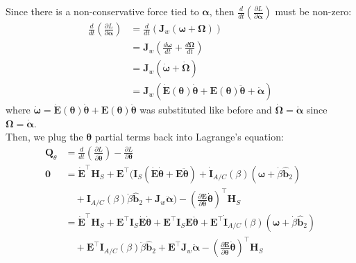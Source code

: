\documentclass[titlepage]{article}
\begin{document}
Since there is a non-conservative force tied to $\boldsymbol{\alpha}$, then $\frac{d}{dt}(\frac{\partial L}{\partial\dot{\boldsymbol{\alpha}}})$ must be non-zero:
\begin{equation}
	\begin{split}
		\frac{d}{dt}\left(\frac{\partial L}{\partial\dot{\boldsymbol{\alpha}}}\right)&=\frac{d}{dt}\left(\boldsymbol{J}_w\left(\boldsymbol{\omega}+\boldsymbol{\Omega}\right)\right) \\
		&=\boldsymbol{J}_w\left(\frac{d\boldsymbol{\omega}}{dt}+\frac{d\boldsymbol{\Omega}}{dt}\right) \\
		&=\boldsymbol{J}_w\left(\dot{\boldsymbol{\omega}}+\dot{\boldsymbol{\Omega}}\right) \\
		&=\boldsymbol{J}_w\left(\dot{\boldsymbol{E}}(\boldsymbol{\theta})\dot{\boldsymbol{\theta}}+\boldsymbol{E}(\boldsymbol{\theta})\ddot{\boldsymbol{\theta}}+\ddot{\boldsymbol{\alpha}}\right)
	\end{split}
\end{equation}
where $\dot{\boldsymbol{\omega}}=\dot{\boldsymbol{E}}(\boldsymbol{\theta})\dot{\boldsymbol{\theta}}+\boldsymbol{E}(\boldsymbol{\theta})\ddot{\boldsymbol{\theta}}$ was substituted like before and $\dot{\boldsymbol{\Omega}}=\ddot{\boldsymbol{\alpha}}$ since $\boldsymbol{\Omega}=\dot{\boldsymbol{\alpha}}$. \\

Then, we plug the $\boldsymbol{\theta}$ partial terms back into Lagrange's equation:
\begin{equation}
	\begin{split}
		\boldsymbol{Q}_\theta&=\frac{d}{dt}\left(\frac{\partial L}{\partial\dot{\boldsymbol{\theta}}}\right)-\frac{\partial L}{\partial\boldsymbol{\theta}} \\
		\boldsymbol{0}&=\dot{\boldsymbol{E}}^\top\boldsymbol{H}_S+\boldsymbol{E}^\top\Big(\boldsymbol{I}_S\left(\dot{\boldsymbol{E}}\dot{\boldsymbol{\theta}}+\boldsymbol{E}\ddot{\boldsymbol{\theta}}\right)+\dot{\boldsymbol{I}}_{A/C}(\beta)\left(\boldsymbol{\omega}+\dot{\beta}\hat{\boldsymbol{b}}_2\right) \\
		&\quad+\boldsymbol{I}_{A/C}(\beta)\ddot{\beta}\hat{\boldsymbol{b}}_2+\boldsymbol{J}_w\ddot{\boldsymbol{\alpha}}\Big)-\left(\frac{\partial\boldsymbol{E}}{\partial\boldsymbol{\theta}}\dot{\boldsymbol{\theta}}\right)^\top\boldsymbol{H}_S \\
		&=\dot{\boldsymbol{E}}^\top\boldsymbol{H}_S+\boldsymbol{E}^\top\boldsymbol{I}_S\dot{\boldsymbol{E}}\dot{\boldsymbol{\theta}}+\boldsymbol{E}^\top\boldsymbol{I}_S\boldsymbol{E}\ddot{\boldsymbol{\theta}}+\boldsymbol{E}^\top\dot{\boldsymbol{I}}_{A/C}(\beta)\left(\boldsymbol{\omega}+\dot{\beta}\hat{\boldsymbol{b}}_2\right) \\
		&\quad+\boldsymbol{E}^\top\boldsymbol{I}_{A/C}(\beta)\ddot{\beta}\hat{\boldsymbol{b}}_2+\boldsymbol{E}^\top\boldsymbol{J}_w\ddot{\boldsymbol{\alpha}}-\left(\frac{\partial\boldsymbol{E}}{\partial\boldsymbol{\theta}}\dot{\boldsymbol{\theta}}\right)^\top\boldsymbol{H}_S
	\end{split}
\end{equation}
\end{document}
